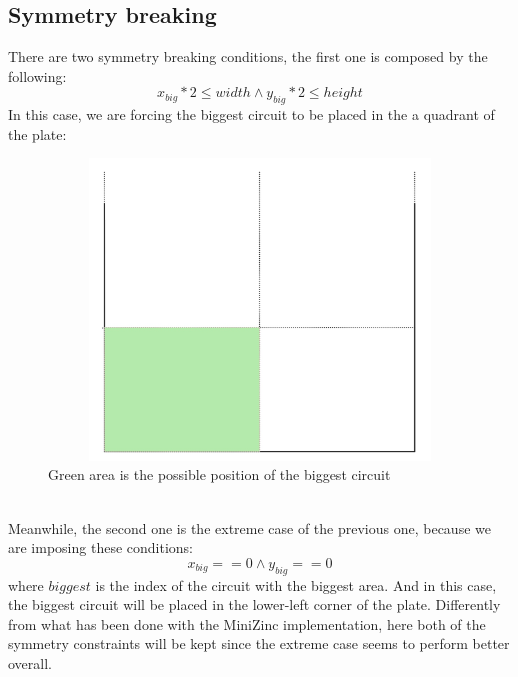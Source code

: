 \subsection{Symmetry breaking}\label{subsec:smt-symmetry-breaking}
There are two symmetry breaking conditions, the first one is composed by the following:
\begin{equation}
    x_{big} * 2 \leq width \wedge y_{big}* 2\leq height
\end{equation}
In this case, we are forcing the biggest circuit to be placed in the a quadrant of the plate: 
\begin{figure}[!h]
 \centering
 \includegraphics[width=12cm, height=8cm]{images/quadtants.PNG}
 \caption{Green area is the possible position of the biggest circuit}
\end{figure}\\
Meanwhile, the second one is the extreme case of the previous one, because we are imposing these conditions:
\begin{equation}
    x_{big} == 0 \wedge y_{big} == 0
\end{equation}
where $biggest$ is the index of the circuit with the biggest area. And in this case, the biggest circuit will be placed in the lower-left corner of the plate. Differently from what has been done with the MiniZinc implementation, here both of the symmetry constraints will be kept since the extreme case seems to perform better overall.  

